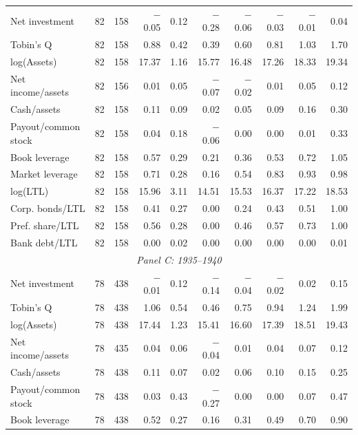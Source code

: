 \begin{table}[p]
\begin{threeparttable}
\begin{tabular}{lrrrrrrrrr}
            \midrule
            Net investment & 82 & 158 & $-$0.05 & 0.12 & $-$0.28 & $-$0.06 & $-$0.03 & $-$0.01 & 0.04 \\
            Tobin's Q & 82 & 158 & 0.88 & 0.42 & 0.39 & 0.60 & 0.81 & 1.03 & 1.70 \\
            log(Assets) & 82 & 158 & 17.37 & 1.16 & 15.77 & 16.48 & 17.26 & 18.33 & 19.34 \\
            Net income/assets & 82 & 156 & 0.01 & 0.05 & $-$0.07 & $-$0.02 & 0.01 & 0.05 & 0.12 \\
            Cash/assets & 82 & 158 & 0.11 & 0.09 & 0.02 & 0.05 & 0.09 & 0.16 & 0.30 \\
            Payout/common stock & 82 & 158 & 0.04 & 0.18 & $-$0.06 & 0.00 & 0.00 & 0.01 & 0.33 \\
            Book leverage & 82 & 158 & 0.57 & 0.29 & 0.21 & 0.36 & 0.53 & 0.72 & 1.05 \\
            Market leverage & 82 & 158 & 0.71 & 0.28 & 0.16 & 0.54 & 0.83 & 0.93 & 0.98 \\
            log(LTL) & 82 & 158 & 15.96 & 3.11 & 14.51 & 15.53 & 16.37 & 17.22 & 18.53 \\
            Corp. bonds/LTL & 82 & 158 & 0.41 & 0.27 & 0.00 & 0.24 & 0.43 & 0.51 & 1.00 \\
            Pref. share/LTL & 82 & 158 & 0.56 & 0.28 & 0.00 & 0.46 & 0.57 & 0.73 & 1.00 \\
            Bank debt/LTL & 82 & 158 & 0.00 & 0.02 & 0.00 & 0.00 & 0.00 & 0.00 & 0.01 \\
            \midrule
            \multicolumn{10}{c}{\textit{Panel C: 1935--1940}} \\
            \midrule
            Net investment & 78 & 438 & $-$0.01 & 0.12 & $-$0.14 & $-$0.04 & $-$0.02 & 0.02 & 0.15 \\
            Tobin's Q & 78 & 438 & 1.06 & 0.54 & 0.46 & 0.75 & 0.94 & 1.24 & 1.99 \\
            log(Assets) & 78 & 438 & 17.44 & 1.23 & 15.41 & 16.60 & 17.39 & 18.51 & 19.43 \\
            Net income/assets & 78 & 435 & 0.04 & 0.06 & $-$0.04 & 0.01 & 0.04 & 0.07 & 0.12 \\
            Cash/assets & 78 & 438 & 0.11 & 0.07 & 0.02 & 0.06 & 0.10 & 0.15 & 0.25 \\
            Payout/common stock & 78 & 438 & 0.03 & 0.43 & $-$0.27 & 0.00 & 0.00 & 0.07 & 0.47 \\
            Book leverage & 78 & 438 & 0.52 & 0.27 & 0.16 & 0.31 & 0.49 & 0.70 & 0.90 \\

\end{tabular}
\end{threeparttable}
\end{table}
